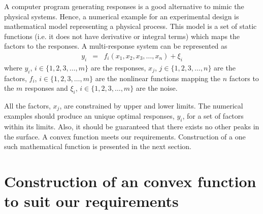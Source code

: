\documentclass[letterpaper, 12pt]{article}
\begin{document}
	\par
	A computer program generating responses is a good alternative to mimic the physical systems. Hence, a numerical example for an experimental design is mathematical model representing a physical process. This model is a set of static functions (i.e. it does not have derivative or integral terms) which maps the factors to the responses. A multi-response system can be represented as
	\begin{eqnarray}
	y_i &=& f_i(x_1, x_2, x_3, \dots, x_n) + \xi_i \label{Eqn:Function}
	\end{eqnarray}
	\noindent where $y_i$, $i\in \{1,2,3, \dots, m\}$ are the responses, $x_j$, $j\in \{1,2,3, \dots, n\}$ are the factors, $f_i$, $i\in \{1,2,3, \dots, m\}$ are the nonlinear functions mapping the $n$ factors to the $m$ responses and $\xi_i$, $i\in \{1,2,3, \dots, m\}$ are the noise.
	\par
	All the factors, $x_j$, are constrained by upper and lower limits. The numerical examples should produce an unique optimal responses, $y_i$, for a set of factors within its limits. Also, it should be guaranteed that there exists no other peaks in the surface. A convex function meets our requirements. Construction of a one such mathematical function is presented in the next section.
	\section{Construction of an convex function to suit our requirements}
\end{document}
